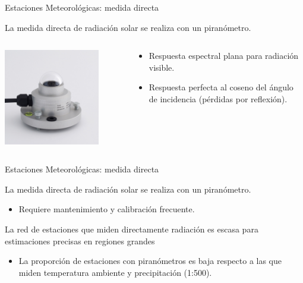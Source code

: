 \documentclass[xcolor={usenames,svgnames,dvipsnames}]{beamer}
\begin{document}
\begin{frame}[label=sec-6-2-2]{Estaciones Meteorológicas: medida directa}
\begin{block}{La medida directa de radiación solar se realiza con un piranómetro.}
\end{block}
\begin{columns}
\begin{column}{0.4\textwidth}
\begin{center}
\includegraphics[width=0.8\textwidth]{../figs/piranometro.jpg}
\end{center}
\end{column}
\begin{column}{0.6\textwidth}

\begin{itemize}
\item Respuesta espectral plana para radiación visible.
\item Respuesta perfecta al coseno del ángulo de incidencia (pérdidas por reflexión).
\end{itemize}
\end{column}
\end{columns}
\end{frame}


\begin{frame}[label=sec-6-2-3]{Estaciones Meteorológicas: medida directa}
\begin{block}{La medida directa de radiación solar se realiza con un piranómetro.}
\begin{itemize}
\item Requiere mantenimiento y calibración frecuente.
\end{itemize}
\end{block}

\begin{block}{La red de estaciones que miden directamente radiación es escasa para estimaciones precisas en regiones grandes}
\begin{itemize}
\item La proporción de estaciones con piranómetros es baja respecto a
las que miden temperatura ambiente y precipitación (1:500).
\end{itemize}
\end{block}
\end{frame}
\end{document}
